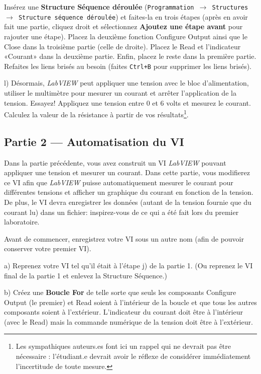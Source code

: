 \documentclass[canadien,12pt,oneside,letterpaper]{article}
\begin{document}
Insérez une \textbf{Structure Séquence déroulée} (\texttt{Programmation $\rightarrow$ Structures $\rightarrow$ Structure séquence déroulée}) et faites-la en trois étapes (après en avoir fait une partie, cliquez droit et sélectionnez \textbf{Ajoutez une étape avant} pour rajouter une étape).  Placez la deuxième fonction Configure Output ainsi que le Close dans la troisième partie (celle de droite). Placez le Read et l'indicateur «Courant» dans la deuxième partie. Enfin, placez le reste dans la première partie. Refaites les liens brisés au besoin (faites \texttt{Ctrl+B} pour supprimer les liens brisés).

l) Désormais, \textit{LabVIEW} peut appliquer une tension avec le bloc d'alimentation, utiliser le multimètre pour mesurer un courant et arrêter l'application de la tension. Essayez! Appliquez une tension entre 0 et 6 volts et mesurez le courant. Calculez la valeur de la résistance à partir de vos résultats\footnote{Les sympathiques auteurs.es font ici un rappel qui ne devrait pas être nécessaire : l'étudiant.e devrait avoir le réflexe de considérer immédiatement l'incertitude de toute mesure.}.


\subsection{Partie 2 --- Automatisation du VI}

Dans la partie précédente, vous avez construit un VI \textit{LabVIEW} pouvant appliquer une tension et mesurer un courant. Dans cette partie, vous modifierez ce VI afin que \textit{LabVIEW} puisse automatiquement mesurer le courant pour différentes tensions et afficher un graphique du courant en fonction de la tension. De plus, le VI devra enregistrer les données (autant de la tension fournie que du courant lu) dans un fichier: inspirez-vous de ce qui a été fait lors du premier laboratoire.

Avant de commencer, enregistrez votre VI sous un autre nom (afin de pouvoir conserver votre premier VI).

a) Reprenez votre VI tel qu'il était à l'étape j) de la partie 1. (Ou reprenez le VI final de la partie 1 et enlevez la Structure Séquence.)

b) Créez une \textbf{Boucle For} de telle sorte que seuls les composants Configure Output (le premier) et Read soient à l'intérieur de la boucle et que tous les autres composants soient à l'extérieur. L'indicateur du courant doit être à l'intérieur (avec le Read) mais la commande numérique de la tension doit être à l'extérieur.
\end{document}

